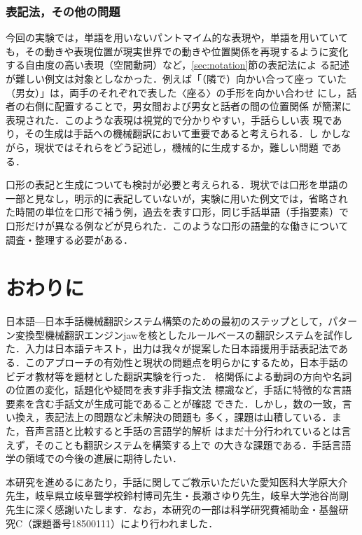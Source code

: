 \documentclass[japanese]{jnlp_1.4}
\begin{document}
\subsubsection{表記法，その他の問題}

今回の実験では，単語を用いないパントマイム的な表現や，単語を用いていて
も，その動きや表現位置が現実世界での動きや位置関係を再現するように変化
する自由度の高い表現（空間動詞）など，\ref{sec:notation}節の表記法によ
る記述が難しい例文は対象としなかった．例えば「（隣で）向かい合って座っ
ていた（男女）」は，両手のそれぞれで表した〈座る〉の手形を向かい合わせ
にし，話者の右側に配置することで，男女間および男女と話者の間の位置関係
が簡潔に表現された．このような表現は視覚的で分かりやすい，手話らしい表
現であり，その生成は手話への機械翻訳において重要であると考えられる．し
かしながら，現状ではそれらをどう記述し，機械的に生成するか，難しい問題
である．

口形の表記と生成についても検討が必要と考えられる．現状では口形を単語の
一部と見なし，明示的に表記していないが，実験に用いた例文では，省略され
た時間の単位を口形で補う例，過去を表す口形，同じ手話単語（手指要素）で
口形だけが異なる例などが見られた．このような口形の語彙的な働きについて
調査・整理する必要がある．


\section{おわりに}


日本語—日本手話機械翻訳システム構築のための最初のステップとして，パター
ン変換型機械翻訳エンジンjawを核としたルールベースの翻訳システムを試作し
た．入力は日本語テキスト，出力は我々が提案した日本語援用手話表記法であ
る．このアプローチの有効性と現状の問題点を明らかにするため，日本手話の
ビデオ教材等を題材とした翻訳実験を行った．
格関係による動詞の方向や名詞の位置の変化，話題化や疑問を表す非手指文法
標識など，手話に特徴的な言語要素を含む手話文が生成可能であることが確認
できた．しかし，数の一致，言い換え，表記法上の問題など未解決の問題も
多く，課題は山積している．また，音声言語と比較すると手話の言語学的解析
はまだ十分行われているとは言えず，そのことも翻訳システムを構築する上で
の大きな課題である．手話言語学の領域での今後の進展に期待したい．


\acknowledgment

本研究を進めるにあたり，手話に関してご教示いただいた愛知医科大学原大介
先生，岐阜県立岐阜聾学校鈴村博司先生・長瀬さゆり先生，岐阜大学池谷尚剛
先生に深く感謝いたします．なお，本研究の一部は科学研究費補助金・基盤研
究C（課題番号18500111）により行われました．
\end{document}
